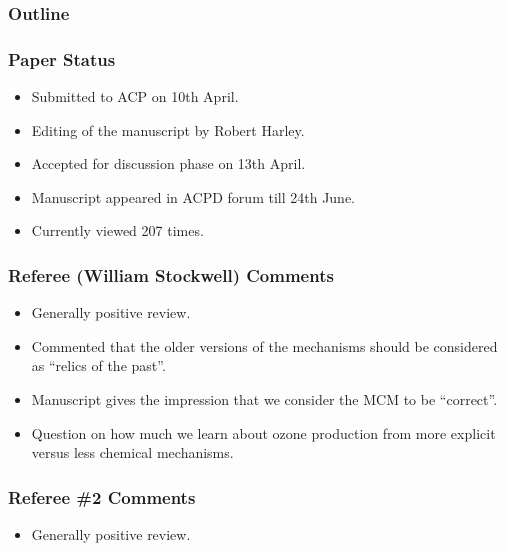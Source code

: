 \begin{frame}
    \frametitle{Outline} 
    \tableofcontents[currentsection]
\end{frame} 

\begin{frame}
    \frametitle{Paper Status}

    \begin{itemize}
        \item Submitted to ACP on 10th April.
        \item Editing of the manuscript by Robert Harley.
        \item Accepted for discussion phase on 13th April.
        \item Manuscript appeared in ACPD forum till 24th June.
        \item Currently viewed \alert{207} times.
    \end{itemize}
\end{frame}

\begin{frame}
    \frametitle{Referee (William Stockwell) Comments}

        \begin{itemize}
            \item Generally positive review.
            \item Commented that the older versions of the mechanisms should be considered as ``relics of the past''.
            \item Manuscript gives the impression that we consider the MCM to be ``correct''.
            \item Question on how much we learn about ozone production from more explicit versus less chemical mechanisms.
        \end{itemize}
\end{frame}

\begin{frame}
    \frametitle{Referee \#2 Comments}

        \begin{itemize}
            \item Generally positive review.
        \end{itemize}
\end{frame}
